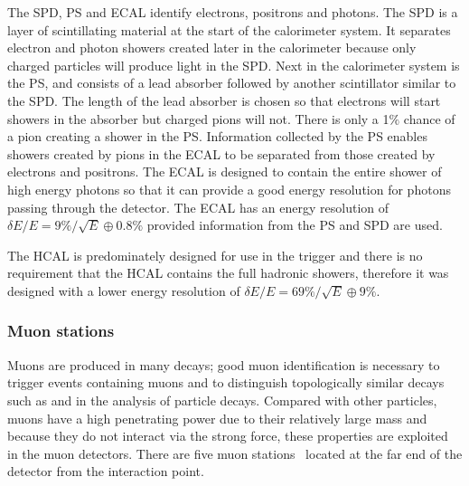 The SPD, PS and ECAL identify electrons, positrons and photons. The SPD is a layer of scintillating material at the start of the calorimeter system. It separates electron and photon showers created later in the calorimeter because only charged particles will produce light in the SPD. Next in the calorimeter system is the PS, and consists of a lead absorber followed by another scintillator similar to the SPD. The length of the lead absorber is chosen so that electrons will start showers in the absorber but charged pions will not. There is only a 1$\%$ chance of a pion creating a shower in the PS. Information collected by the PS enables showers created by pions in the ECAL to be separated from those created by electrons and positrons. The ECAL is designed to contain the entire shower of high energy photons so that it can provide a good energy resolution for photons passing through the detector. The ECAL has an energy resolution of $\delta E / E = 9\%/\sqrt{E} \oplus 0.8\%$  provided information from the PS and SPD are used. 

The HCAL is predominately designed for use in the trigger and there is no requirement that the HCAL contains the full hadronic showers, therefore it was designed with a lower energy resolution of $\delta E / E = 69\% / \sqrt{E} \oplus 9\%$. 


\subsubsection{Muon stations}
\label{Muon_stations}

Muons are produced in many \bhadron decays; good muon identification is necessary to trigger events containing muons and to distinguish topologically similar decays such as \bmumu and \bdkpi in the analysis of particle decays. 
Compared with other particles, muons have a high penetrating power due to their relatively large mass and because they do not interact via the strong force, these properties are exploited in the muon detectors. There are five muon stations~\cite{Barbosa-Marinho:504326} located at the far end of the detector from the interaction point. %


